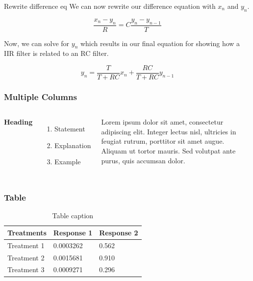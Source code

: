 \documentclass{beamer}
\begin{document}
\begin{frame}
\begin{block}{Rewrite difference eq}
We can now rewrite our difference equation with $x_n$ and $y_n$.

\begin{equation}\label{diff_xn}
\frac{x_n-y_n}{R}=C\frac{y_n-y_{n-1}}{T}
\end{equation}

Now, we can solve for $y_n$ which results in our final equation for showing how a IIR filter is related to an RC filter.

\begin{equation}\label{IIR_RC}
y_n=\frac{T}{T+RC}x_n+\frac{RC}{T+RC}y_{n-1}
\end{equation}
\end{block}
\end{frame}

%

\begin{frame}
\frametitle{Multiple Columns}
\begin{columns}[c] %

\textbf{Heading}
\begin{enumerate}
\item Statement
\item Explanation
\item Example
\end{enumerate}

Lorem ipsum dolor sit amet, consectetur adipiscing elit. Integer lectus nisl, ultricies in feugiat rutrum, porttitor sit amet augue. Aliquam ut tortor mauris. Sed volutpat ante purus, quis accumsan dolor.

\end{columns}
\end{frame}


\begin{frame}
\frametitle{Table}
\begin{table}
\begin{tabular}{l l l}
\toprule
\textbf{Treatments} & \textbf{Response 1} & \textbf{Response 2}\\
\midrule
Treatment 1 & 0.0003262 & 0.562 \\
Treatment 2 & 0.0015681 & 0.910 \\
Treatment 3 & 0.0009271 & 0.296 \\
\bottomrule
\end{tabular}
\caption{Table caption}
\end{table}
\end{frame}
\end{document}
